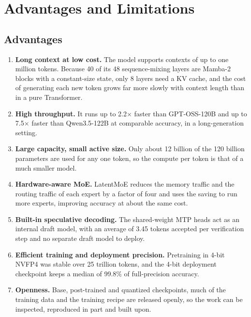 \chapter{Advantages and Limitations}
\label{ch:adv}

\section{Advantages}

\begin{enumerate}
  \item \textbf{Long context at low cost.} The model supports contexts of up
        to one million tokens. Because 40 of its 48 sequence-mixing layers are
        Mamba-2 blocks with a constant-size state, only 8 layers need a KV
        cache, and the cost of generating each new token grows far more slowly
        with context length than in a pure Transformer.
  \item \textbf{High throughput.} It runs up to 2.2$\times$ faster than
        GPT-OSS-120B and up to 7.5$\times$ faster than Qwen3.5-122B at
        comparable accuracy, in a long-generation setting.
  \item \textbf{Large capacity, small active size.} Only about 12 billion of
        the 120 billion parameters are used for any one token, so the compute
        per token is that of a much smaller model.
  \item \textbf{Hardware-aware MoE.} LatentMoE reduces the memory traffic and
        the routing traffic of each expert by a factor of four and uses the
        saving to run more experts, improving accuracy at about the same cost.
  \item \textbf{Built-in speculative decoding.} The shared-weight MTP heads act
        as an internal draft model, with an average of 3.45 tokens accepted
        per verification step and no separate draft model to deploy.
  \item \textbf{Efficient training and deployment precision.} Pretraining in
        4-bit NVFP4 was stable over 25 trillion tokens, and the 4-bit
        deployment checkpoint keeps a median of 99.8\% of full-precision
        accuracy.
  \item \textbf{Openness.} Base, post-trained and quantized checkpoints, much
        of the training data and the training recipe are released openly, so
        the work can be inspected, reproduced in part and built upon.
\end{enumerate}

